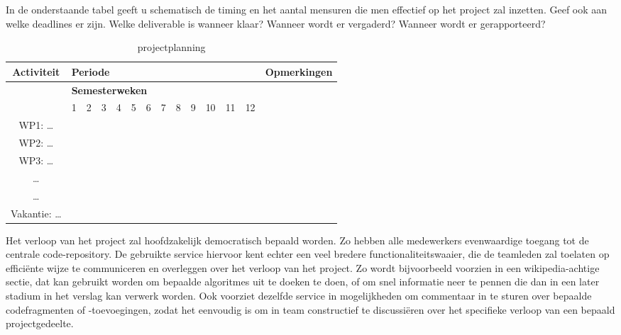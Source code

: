 \documentclass[]{book}
\begin{document}
In de onderstaande tabel geeft u schematisch de timing en het aantal mensuren die men effectief op het project zal inzetten. Geef ook aan welke deadlines er zijn. Welke deliverable is wanneer klaar? Wanneer wordt er vergaderd? Wanneer wordt er gerapporteerd?

\begin{table}[h]
	\centering
		\begin{tabular}{|*{14}{c|}}
		\hline
		\textbf{Activiteit} & \multicolumn{12}{l|}{\textbf{Periode}} & \textbf{Opmerkingen} \\
		\hline
							 & \multicolumn{12}{l|}{\textbf{Semesterweken}} &   \\
		\hline 
		  & 1	& 2	& 3	& 4	& 5	& 6	& 7	& 8	& 9	& 10 & 11	& 12 & \\
		\hline 
		WP1: \ldots & & & & & & & & & & & & & \\
		\hline 
		WP2: \ldots & & & & & & & & & & & & & \\
		\hline 
		WP3: \ldots & & & & & & & & & & & & & \\
		\hline 
		 \ldots & & & & & & & & & & & & & \\
		\hline 
		 \ldots & & & & & & & & & & & & & \\
		\hline 
		Vakantie: \ldots & & & & & & & & & & & & & \\
		\hline
		\end{tabular}
	\caption{projectplanning}
	\label{tab:projectplanning}
\end{table}
																							


Het verloop van het project zal hoofdzakelijk democratisch bepaald worden. Zo hebben alle medewerkers evenwaardige toegang tot de centrale code-repository. De gebruikte service hiervoor kent echter een veel bredere functionaliteitswaaier, die de teamleden zal toelaten op efficiënte wijze te communiceren en overleggen over het verloop van het project. Zo wordt bijvoorbeeld voorzien in een wikipedia-achtige sectie, dat kan gebruikt worden om bepaalde algoritmes uit te doeken te doen, of om snel informatie neer te pennen die dan in een later stadium in het verslag kan verwerk worden. Ook voorziet dezelfde service in mogelijkheden om commentaar in te sturen over bepaalde codefragmenten of -toevoegingen, zodat het eenvoudig is om in team constructief te discussiëren over het specifieke verloop van een bepaald projectgedeelte.
\end{document}
